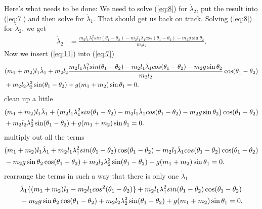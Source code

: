 \documentclass[paper=a4, fontsize=11pt]{scrartcl} %
\numberwithin{equation}{section} %
\numberwithin{figure}{section} %
\numberwithin{table}{section} %
\begin{document}
\vspace{\baselineskip}
Here's what needs to be done: We need to solve (\ref{eq:8}) for $\dot{\lambda}_2$, put the result into (\ref{eq:7}) and then solve for $\dot{\lambda}_1$. That should get us back on track.
Solving (\ref{eq:8}) for $\dot{\lambda}_2$, we get
\begin{align} \label{eq:11}
  \dot{\lambda}_2 &= \frac{m_2 l_1 \lambda^2_1 sin(\theta_1 - \theta_2) - m_2 l_1 \dot{\lambda}_1 cos(\theta_1 - \theta_2) - m_2 g \sin \theta_2}{m_2 l_2}.
\end{align}
Now we insert (\ref{eq:11}) into (\ref{eq:7})
\begin{align} 
  &(m_1 + m_2) l_1 \dot{\lambda}_1 + m_2 l_2 \frac{m_2 l_1 \lambda^2_1 sin(\theta_1 - \theta_2) - m_2 l_1 \dot{\lambda}_1 cos(\theta_1 - \theta_2) - m_2 g \sin \theta_2}{m_2 l_2}\cos(\theta_1 - \theta_2)  \notag \\
  &+ m_2 l_2 \lambda^2_2 \sin(\theta_1 - \theta_2) + g (m_1 + m_2) \sin \theta_1 = 0. \label{eq:12}
\end{align}
clean up a little
\begin{align} 
  &(m_1 + m_2) l_1 \dot{\lambda}_1 + \left( m_2 l_1 \lambda^2_1 sin(\theta_1 - \theta_2) - m_2 l_1 \dot{\lambda}_1 cos(\theta_1 - \theta_2) - m_2 g \sin \theta_2 \right) \cos(\theta_1 - \theta_2)  \notag \\
  &+ m_2 l_2 \lambda^2_2 \sin(\theta_1 - \theta_2) + g (m_1 + m_2) \sin \theta_1 = 0. \label{eq:13}
\end{align}
multiply out all the terms
\begin{align} 
  &(m_1 + m_2) l_1 \dot{\lambda}_1 + m_2 l_1 \lambda^2_1 sin(\theta_1 - \theta_2)\cos(\theta_1 - \theta_2) - m_2 l_1 \dot{\lambda}_1 cos(\theta_1 - \theta_2)\cos(\theta_1 - \theta_2)    \notag \\
  & - m_2 g \sin \theta_2\cos(\theta_1 - \theta_2) + m_2 l_2 \lambda^2_2 \sin(\theta_1 - \theta_2) + g (m_1 + m_2) \sin \theta_1 = 0. \label{eq:14}
\end{align}
rearrange the terms in such a way that there is only one $\dot{\lambda}_1$
\begin{align} 
  &\dot{\lambda}_1 \{(m_1 + m_2) l_1 - m_2 l_1 cos^2(\theta_1 - \theta_2)\} + m_2 l_1 \lambda^2_1 sin(\theta_1 - \theta_2)\cos(\theta_1 - \theta_2)   \notag \\
  & - m_2 g \sin \theta_2 \cos(\theta_1 - \theta_2) + m_2 l_2 \lambda^2_2 \sin(\theta_1 - \theta_2) + g (m_1 + m_2) \sin \theta_1 = 0. \label{eq:15}
\end{align}
\end{document}
